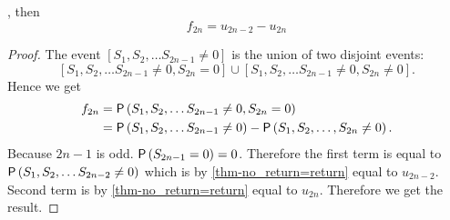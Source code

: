 \begin{thm}\label{thm-f_2n}
  \Lrws, then
 \[
 f_{2n}=u_{2n-2}-u_{2n}
 \]
\end{thm}
\begin{proof}
 The event $[S_1, S_2, \ldots S_{2n-1}\neq 0]$ is the union of two disjoint events:
 \[
 [S_1, S_2, \ldots S_{2n-1}\neq 0, S_{2n}=0] \cup [S_1, S_2, \ldots S_{2n-1}\neq 0, S_{2n}\neq 0].
 \]
 Hence we get
\[
  \begin{split}
    f_{2n} & =\operatorname{\mathsf{P}} \left( S_1, S_2, \ldots S_{2n-1}\neq 0, S_{2n}=0 \right)\\
    & =\operatorname{\mathsf{P}} \left( S_1, S_2, \ldots S_{2n-1}\neq 0 \right) -\operatorname{\mathsf{P}} \left( S_1, S_2, \ldots, S_{2n}\neq 0 \right).
  \end{split}
 \]
 Because $2n-1$ is odd. $\operatorname{\mathsf{P}} \left( S_{2n-1}=0 \right) =0$.
 Therefore the first term is equal to $\operatorname{\mathsf{P}} \left( S_1, S_2, \ldots S_{2n-2}\neq 0 \right)$
 which is by \ref{thm-no_return=return} equal to $u_{2n-2}$. Second term is by \ref{thm-no_return=return} equal to $u_{2n}$. Therefore we get the result.
\end{proof}
